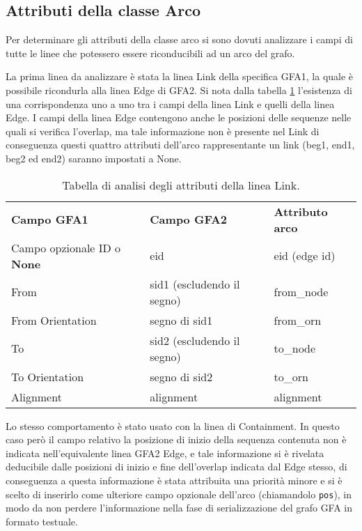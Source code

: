 \subsection{Attributi della classe Arco}
Per determinare gli attributi della classe arco si sono dovuti analizzare i campi
di tutte le linee che potessero essere riconducibili ad un arco del grafo.

La prima linea da analizzare è stata la linea Link della specifica GFA1, la quale è
possibile ricondurla alla linea Edge di GFA2. Si nota dalla tabella \ref{tab:link-analysis}
l'esistenza di una corrispondenza uno a uno tra i campi della linea Link e quelli
della linea Edge. I campi della linea Edge contengono anche le posizioni
delle sequenze nelle quali si verifica l'overlap, ma tale informazione non è presente
nel Link di conseguenza questi quattro attributi dell'arco rappresentante un link
(beg1, end1, beg2 ed end2) saranno impostati a None.

\noindent
\begin{table}[h]
	\begin{tabularx}{\textwidth}{ | X | X | X |}
		\hline
		\textbf{Campo GFA1}	&	\textbf{Campo GFA2}			&	\textbf{Attributo arco}\\
		Campo opzionale ID o	\mbox{\textbf{None}}				&	eid					&	eid (edge id)\\
		From				&	sid1 (escludendo il segno)		&	from\_node\\
		From Orientation		&	segno di sid1					&	from\_orn\\
		To					&	sid2 (escludendo il segno)		&	to\_node\\
		To Orientation			&	segno di sid2					&	to\_orn\\
		Alignment				&	alignment						&	alignment\\
		\hline
	\end{tabularx}
	\caption{Tabella di analisi degli attributi della linea Link.}
	\label{tab:link-analysis}
\end{table}

Lo stesso comportamento è stato usato con la linea di Containment. In questo
caso però il campo relativo la posizione di inizio della sequenza contenuta non
è indicata nell'equivalente linea GFA2 Edge, e tale informazione
si è rivelata deducibile dalle posizioni di inizio e fine dell'overlap
indicata dal Edge stesso, di conseguenza a questa informazione è stata attribuita
una priorità minore e si è scelto di inserirlo come ulteriore campo opzionale dell'arco (chiamandolo
\texttt{pos}),
in modo da non perdere l'informazione nella fase di serializzazione
del grafo GFA in formato testuale.

